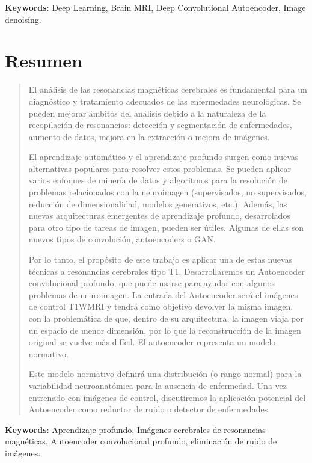 
\textbf{Keywords}: Deep Learning, Brain MRI, Deep Convolutional Autoencoder, Image denoising.

\clearpage

\chapter*{\centering Resumen}


\begin{quote}
{El análisis de las resonancias magnéticas cerebrales es fundamental para un diagnóstico y tratamiento adecuados de las enfermedades neurológicas. Se pueden mejorar ámbitos del análisis debido a la naturaleza de la recopilación de resonancias: detección y segmentación de enfermedades, aumento de datos, mejora en la extracción o mejora de imágenes.

El aprendizaje automático y el aprendizaje profundo surgen como nuevas alternativas populares para resolver estos problemas. Se pueden aplicar varios enfoques de minería de datos y algoritmos para la resolución de problemas relacionados con la neuroimagen (supervisados, no supervisados, reducción de dimensionalidad, modelos generativos, etc.). Además, las nuevas arquitecturas emergentes de aprendizaje profundo, desarrolados para otro tipo de tareas de imagen, pueden ser útiles. Algunas de ellas son nuevos tipos de convolución, autoencoders o GAN.

Por lo tanto, el propósito de este trabajo es aplicar una de estas nuevas técnicas a resonancias cerebrales tipo T1. Desarrollaremos un Autoencoder convolucional profundo, que puede usarse para ayudar con algunos problemas de neuroimagen. La entrada del Autoencoder será el imágenes de control T1WMRI y tendrá como objetivo devolver la misma imagen, con la problemática de que, dentro de su arquitectura, la imagen viaja por un espacio de menor dimensión, por lo que la reconstrucción de la imagen original se vuelve más difícil. El autoencoder representa un modelo normativo.

Este modelo normativo definirá una distribución (o rango normal) para la variabilidad neuroanatómica para la ausencia de enfermedad. Una vez entrenado con imágenes de control, discutiremos la aplicación potencial del Autoencoder como reductor de ruido o detector de enfermedades.

}
\end{quote}
\textbf{Keywords}: Aprendizaje profundo, Imágenes cerebrales de resonancias magnéticas, Autoencoder convolucional profundo, eliminación de ruido de imágenes.



\clearpage
